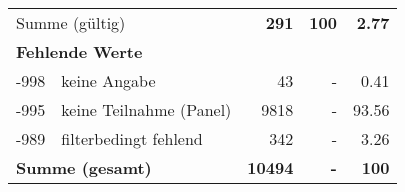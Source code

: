 \begin{longtable}{lXrrr}
     \midrule
     \multicolumn{2}{l}{Summe (gültig)} &
       \textbf{\num{291}} &
     \textbf{\num{100}} &
       \textbf{\num[round-mode=places,round-precision=2]{2.77}} \\
     \multicolumn{5}{l}{\textbf{Fehlende Werte}}\\
       -998 &
       keine Angabe &
         \num{43} &
        - &
         \num[round-mode=places,round-precision=2]{0.41} \\
       -995 &
       keine Teilnahme (Panel) &
         \num{9818} &
        - &
         \num[round-mode=places,round-precision=2]{93.56} \\
       -989 &
       filterbedingt fehlend &
         \num{342} &
        - &
         \num[round-mode=places,round-precision=2]{3.26} \\
     \midrule
     \multicolumn{2}{l}{\textbf{Summe (gesamt)}} &
          \textbf{\num{10494}} &
        \textbf{-} &
        \textbf{\num{100}} \\
     \bottomrule
     \end{longtable}
     

